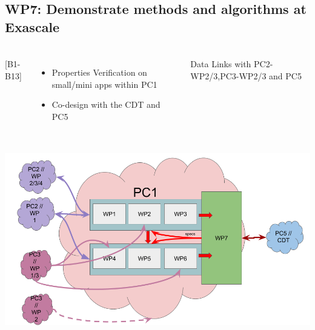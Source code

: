 \subsection{WP7: Demonstrate methods and algorithms at Exascale}
\begin{frame}
  \frametitle{\insertsectionhead}
  \framesubtitle{\insertsubsectionhead}

  \begin{columns}
    [B1-B13]
    \begin{itemize}
      \item Properties Verification on small/mini apps within PC1
      \item Co-design with the CDT and PC5
    \end{itemize}
    \begin{alertblock}{Data }
      Links with PC2-WP2/3,PC3-WP2/3 and PC5
    \end{alertblock}
   
  \end{columns}
\end{frame}

\begin{frame}[plain]
  \frametitle{}
  \framesubtitle{}

  \begin{center}
    \includegraphics[width=.9\linewidth]{../../figures/exama-pc.png}
  \end{center}

  

\end{frame}


